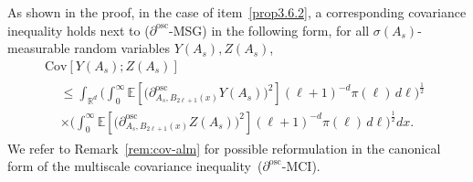 \documentclass[AHL,Unicode,longabstracts]{cedram}
\newcommand{\R}{\mathbb R}
\newcommand{\expec}[1]{\mathbb{E}\left[#1 \right]}
\newcommand{\osc}{\partial^{\mathrm{osc}}}
\newcommand{\oscd}[1]{\mathrel{\osc_{#1}}}
\newcommand{\cov}[2]{\mathrm{Cov}\left[#1;#2\right]}
\begin{document}
\begin{rema}
As shown in the proof, in the case of item~\eqref{prop3.6.2}, a corresponding covariance inequality holds next to ($\osc$-MSG) in the following form, for all $\sigma(A_s)$-measurable random variables $Y(A_s),Z(A_s)$,
\begin{multline}\label{eq:MSG-RPM}
\cov{Y(A_s)}{Z(A_s)}\\
\begin{aligned}
&\le \int_{\R^d}\bigg(\int_0^\infty\expec{\Big(\oscd{A_s,B_{2\ell+1}(x)}Y(A_s)\Big)^2}(\ell+1)^{-d}\pi(\ell)\,d\ell\bigg)^\frac12\\
&\times\bigg(\int_0^\infty\expec{\Big(\oscd{A_s,B_{2\ell+1}(x)}Z(A_s)\Big)^2}(\ell+1)^{-d}\pi(\ell)\,d\ell\bigg)^\frac12dx.
\end{aligned}
\end{multline}
We refer to Remark~\ref{rem:cov-alm} for possible reformulation in the canonical form of the multiscale covariance inequality~($\osc$-MCI).
\end{rema}
\end{document}
